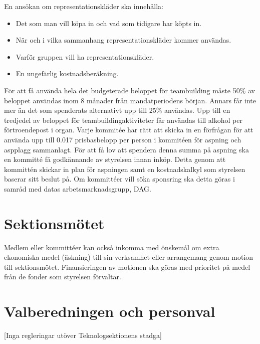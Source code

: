 \documentclass[a4paper]{dtek}
\begin{document}
\para
En ansökan om representationskläder ska innehålla:
\begin{itemize}
  \item Det som man vill köpa in och vad som tidigare har köpts in.
  \item När och i vilka sammanhang representationskläder kommer användas.
  \item Varför gruppen vill ha representationskläder.
  \item En ungefärlig kostnadsberäkning.
\end{itemize}
\para[Teambuilding] För att få använda hela det budgeterade beloppet för teambuilding måste 50\% av beloppet användas inom 8 månader från mandatperiodens början. Annars får inte mer än det som spenderats alternativt upp till 25\% användas.
\para Upp till en tredjedel av beloppet för teambuildingaktiviteter får användas till alkohol per förtroendepost i organ.
\para [Aspning] Varje kommitée har rätt att skicka in en förfrågan för att använda upp till
0.017 prisbasbelopp per person i kommitéen för aspning och aspplagg sammanlagt. För att
få lov att spendera denna summa på aspning ska en kommitté få godkännande av
styrelsen innan inköp. Detta genom att kommittén skickar in plan för aspningen samt
en kostnadskalkyl som styrelsen baserar sitt beslut på.
\para[Sponsring] Om kommittéer vill söka sponsring ska detta göras i samråd med datas arbetsmarknadsgrupp, DAG.
\section{Sektionsmötet}
\para Medlem eller kommittéer kan också inkomma med önskemål om extra ekonomiska medel (äskning) till sin verksamhet eller arrangemang genom motion till sektionsmötet. Finansieringen av motionen ska göras med prioritet på medel från de fonder som styrelsen förvaltar.
\section{Valberedningen och personval}
\begin{center}
  [Inga regleringar utöver Teknologsektionens stadga]
\end{center}
\end{document}
